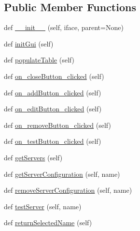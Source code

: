 \subsection*{Public Member Functions}
\begin{DoxyCompactItemize}
\item 
def \mbox{\hyperlink{class_dsg_tools_1_1_server_tools_1_1view_servers_1_1_view_servers_af876053f7dc7817befffdbc79da0f1fc}{\+\_\+\+\_\+init\+\_\+\+\_\+}} (self, iface, parent=None)
\item 
def \mbox{\hyperlink{class_dsg_tools_1_1_server_tools_1_1view_servers_1_1_view_servers_a3b2e474e4cc3ee41cf86163f98ea5d9c}{init\+Gui}} (self)
\item 
def \mbox{\hyperlink{class_dsg_tools_1_1_server_tools_1_1view_servers_1_1_view_servers_a4d8ffeccd0a84daebc1d311d028ae7cb}{populate\+Table}} (self)
\item 
def \mbox{\hyperlink{class_dsg_tools_1_1_server_tools_1_1view_servers_1_1_view_servers_ad671560ae5d8ff0d9f4d5a916053f6a0}{on\+\_\+close\+Button\+\_\+clicked}} (self)
\item 
def \mbox{\hyperlink{class_dsg_tools_1_1_server_tools_1_1view_servers_1_1_view_servers_a463ce1c1979b98080d1bcbcc1839b8d8}{on\+\_\+add\+Button\+\_\+clicked}} (self)
\item 
def \mbox{\hyperlink{class_dsg_tools_1_1_server_tools_1_1view_servers_1_1_view_servers_a7b30a898844e959a84692889dba4f969}{on\+\_\+edit\+Button\+\_\+clicked}} (self)
\item 
def \mbox{\hyperlink{class_dsg_tools_1_1_server_tools_1_1view_servers_1_1_view_servers_a36ff167362cfb77b33c3a334dba8f6d2}{on\+\_\+remove\+Button\+\_\+clicked}} (self)
\item 
def \mbox{\hyperlink{class_dsg_tools_1_1_server_tools_1_1view_servers_1_1_view_servers_a778e3427c24e845df98c73689e392997}{on\+\_\+test\+Button\+\_\+clicked}} (self)
\item 
def \mbox{\hyperlink{class_dsg_tools_1_1_server_tools_1_1view_servers_1_1_view_servers_a5b7b4496925bd02857abb7a4bbf8649b}{get\+Servers}} (self)
\item 
def \mbox{\hyperlink{class_dsg_tools_1_1_server_tools_1_1view_servers_1_1_view_servers_a734c81bf437a09631c00340ab79b3456}{get\+Server\+Configuration}} (self, name)
\item 
def \mbox{\hyperlink{class_dsg_tools_1_1_server_tools_1_1view_servers_1_1_view_servers_ac1337507461537612e927a8171c3afef}{remove\+Server\+Configuration}} (self, name)
\item 
def \mbox{\hyperlink{class_dsg_tools_1_1_server_tools_1_1view_servers_1_1_view_servers_a89e079ce02772a75b08d6ffb77e0b516}{test\+Server}} (self, name)
\item 
def \mbox{\hyperlink{class_dsg_tools_1_1_server_tools_1_1view_servers_1_1_view_servers_a0be08903e376224c84b40183e1cfd327}{return\+Selected\+Name}} (self)
\end{DoxyCompactItemize}
